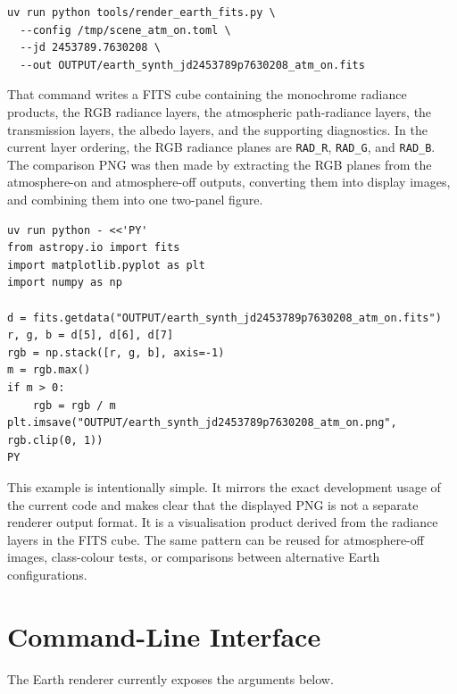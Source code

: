 \documentclass[12pt,a4paper]{article}
\begin{document}
\begin{verbatim}
uv run python tools/render_earth_fits.py \
  --config /tmp/scene_atm_on.toml \
  --jd 2453789.7630208 \
  --out OUTPUT/earth_synth_jd2453789p7630208_atm_on.fits
\end{verbatim}

That command writes a FITS cube containing the monochrome radiance products, the RGB radiance layers, the atmospheric path-radiance layers, the transmission layers, the albedo layers, and the supporting diagnostics. In the current layer ordering, the RGB radiance planes are \texttt{RAD\_R}, \texttt{RAD\_G}, and \texttt{RAD\_B}. The comparison PNG was then made by extracting the RGB planes from the atmosphere-on and atmosphere-off outputs, converting them into display images, and combining them into one two-panel figure.

\begin{verbatim}
uv run python - <<'PY'
from astropy.io import fits
import matplotlib.pyplot as plt
import numpy as np

d = fits.getdata("OUTPUT/earth_synth_jd2453789p7630208_atm_on.fits")
r, g, b = d[5], d[6], d[7]
rgb = np.stack([r, g, b], axis=-1)
m = rgb.max()
if m > 0:
    rgb = rgb / m
plt.imsave("OUTPUT/earth_synth_jd2453789p7630208_atm_on.png", rgb.clip(0, 1))
PY
\end{verbatim}

This example is intentionally simple. It mirrors the exact development usage of the current code and makes clear that the displayed PNG is not a separate renderer output format. It is a visualisation product derived from the radiance layers in the FITS cube. The same pattern can be reused for atmosphere-off images, class-colour tests, or comparisons between alternative Earth configurations.

\section{Command-Line Interface}
The Earth renderer currently exposes the arguments below.
\end{document}
